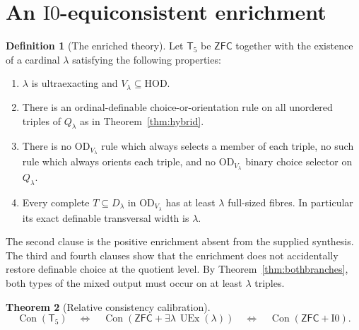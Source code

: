 \documentclass[11pt,letterpaper]{article}
\theoremstyle{definition}
\newtheorem{definition}{Definition}[section]
\newtheorem{theorem}[definition]{Theorem}
\numberwithin{equation}{section}
\newcommand{\ZFC}{\mathsf{ZFC}}
\newcommand{\HOD}{\mathrm{HOD}}
\newcommand{\OD}{\mathrm{OD}}
\newcommand{\UEx}{\operatorname{UEx}}
\newcommand{\Con}{\operatorname{Con}}
\newcommand{\Izero}{\mathrm{I0}}
\newcommand{\Tfive}{\mathsf{T}_5}
\begin{document}
\section{An \texorpdfstring{$\Izero$}{I0}-equiconsistent enrichment}\label{sec:consistency}

\begin{definition}[The enriched theory]\label{def:T5}
Let $\Tfive$ be $\ZFC$ together with the existence of a cardinal $\lambda$ satisfying the following properties:
\begin{enumerate}
\item $\lambda$ is ultraexacting and $V_\lambda\subseteq\HOD$.
\item There is an ordinal-definable choice-or-orientation rule on all unordered triples of $Q_\lambda$ as in Theorem~\ref{thm:hybrid}.
\item There is no $\OD_{V_\lambda}$ rule which always selects a member of each triple, no such rule which always orients each triple, and no $\OD_{V_\lambda}$ binary choice selector on $Q_\lambda$.
\item Every complete $T\subseteq D_\lambda$ in $\OD_{V_\lambda}$ has at least $\lambda$ full-sized fibres. In particular its exact definable transversal width is $\lambda$.
\end{enumerate}
\end{definition}

The second clause is the positive enrichment absent from the supplied synthesis. The third and fourth clauses show that the enrichment does not accidentally restore definable choice at the quotient level. By Theorem~\ref{thm:bothbranches}, both types of the mixed output must occur on at least $\lambda$ triples.

\begin{theorem}[Relative consistency calibration]\label{thm:equiconsistency}
\begin{equation}\label{eq:equiconsistency}
 \Con(\Tfive)
 \quad\Longleftrightarrow\quad
 \Con(\ZFC+\exists\lambda\,\UEx(\lambda))
 \quad\Longleftrightarrow\quad
 \Con(\ZFC+\Izero).
\end{equation}
\end{theorem}
\end{document}
